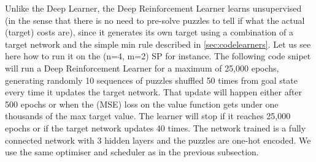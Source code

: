 Unlike the Deep Learner, the Deep Reinforcement Learner learns unsupervised (in the sense that there is no need to pre-solve puzzles to tell if what the actual (target) costs are), since it generates its own target using a combination of a target network and the simple min rule described in \ref{sec:codelearners}. Let us see here how to run it on the (n=4, m=2) SP for instance. The following code snipet will run a Deep Reinforcement Learner for a maximum of 25,000 epochs, generating randomly 10 sequences of puzzles shuffled 50 times from goal state every time it updates the target network. That update will happen either after 500 epochs or when the (MSE) loss on the value function gets under one thousands of the max target value. The learner will stop if it reaches 25,000 epochs or if the target network updates 40 times. The network trained is a fully connected network with 3 hidden layers and the puzzles are one-hot encoded. We use the same optimiser and scheduler as in the previous subsection.

\afblue
